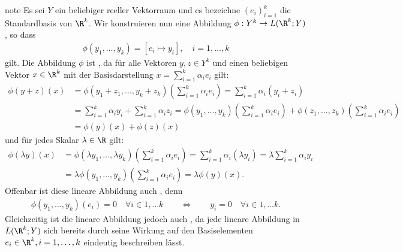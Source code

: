 \documentclass[letterpaper,10pt,english]{jupyterBook}
\begin{document}
\begin{sphinxadmonition}{note}
\sphinxAtStartPar
Es sei \(Y\) ein beliebiger reeller Vektorraum und es bezeichne \((e_i)_{i=1}^k\) die Standardbasis von \(\R^k\).
Wir konstruieren nun eine Abbildung \(\phi:Y^k\rightarrow L(\R^k; Y)\), so dass
\begin{equation*}
\begin{split}\phi(y_1,\ldots,y_k) = [e_i \mapsto y_i], \quad i = 1,\ldots,k\end{split}
\end{equation*}
\sphinxAtStartPar
gilt.
Die Abbildung \(\phi\) ist , da für alle Vektoren \(y,z \in Y^k\) und einen beliebigen Vektor \(x \in \R^k\) mit der Basisdarstellung \(x=\sum_{i=1}^k \alpha_i e_i\) gilt:
\begin{equation*}
\begin{split}\phi(y+z)(x) &= \phi(y_1+z_1,\ldots, y_k+z_k)(\sum_{i=1}^k \alpha_i e_i) = \sum_{i=1}^k \alpha_i (y_i + z_i) \\
&= \sum_{i=1}^k \alpha_i y_i + \sum_{i=1}^k \alpha_i z_i = \phi(y_1,\ldots, y_k)(\sum_{i=1}^k \alpha_i e_i) + \phi(z_1,\ldots, z_k)(\sum_{i=1}^k \alpha_i e_i) \\
&= \phi(y)(x) + \phi(z)(x)\end{split}
\end{equation*}
\sphinxAtStartPar
und für jedes Skalar \(\lambda \in \R\) gilt:
\begin{equation*}
\begin{split}\phi(\lambda y)(x) &= \phi(\lambda y_1,\ldots, \lambda y_k)(\sum_{i=1}^k \alpha_i e_i)
= \sum_{i=1}^k \alpha_i (\lambda y_i) = \lambda \sum_{i=1}^k \alpha_i y_i \\
&= \lambda \phi( y_1,\ldots, y_k)(\sum_{i=1}^k \alpha_i e_i)
= \lambda \phi(y)(x).\end{split}
\end{equation*}
\sphinxAtStartPar
Offenbar ist diese lineare Abbildung auch , denn
\begin{equation*}
\begin{split}\phi(y_1,\ldots,y_k)(e_i) = 0\quad\forall i\in{1,\ldots k} 
\qquad \Leftrightarrow \qquad
y_i = 0\quad\forall i\in{1,\ldots k}.\end{split}
\end{equation*}
\sphinxAtStartPar
Gleichzeitig ist die lineare Abbildung jedoch auch , da jede lineare Abbildung in \(L(\R^k; Y)\) sich bereits durch seine Wirkung auf den Basiselementen \(e_i \in \R^k, i=1,\ldots,k\) eindeutig beschreiben lässt.


\end{sphinxadmonition}
\end{document}
